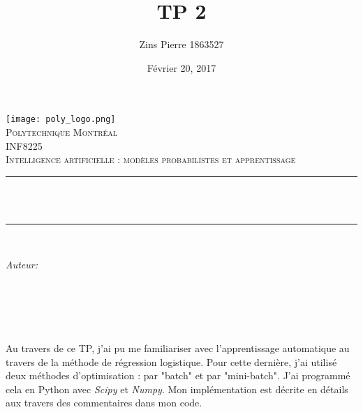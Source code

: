 \documentclass[12pt]{article}
\title{TP 2}								%
\author{Zins Pierre 1863527}						%
\date{Février 20, 2017}							%
\makeatletter
\let\thetitle\@title
\let\theauthor\@author
\let\thedate\@date
\makeatother
\begin{document}

\begin{titlepage}
	\centering
    \vspace*{0.5 cm}
    \texttt{[image: poly\_logo.png]}\\[1.0 cm]	%
    \textsc{\LARGE Polytechnique Montréal}\\[2.0 cm]	%
	\textsc{\Large INF8225 }\\[0.5 cm]				%
	\textsc{Intelligence artificielle : modèles probabilistes et apprentissage}\\[0.5 cm]				%
	\rule{\linewidth}{0.2 mm} \\[0.4 cm]
	{ \huge \bfseries \thetitle}\\
	\rule{\linewidth}{0.2 mm} \\[1.5 cm]
	
	\begin{minipage}{0.4\textwidth}
		\begin{flushleft} \large
			\emph{Auteur:}\\
			\theauthor
			\end{flushleft}
			\end{minipage}~
			\begin{minipage}{0.4\textwidth}
			\begin{flushright} \large
		\end{flushright}
	\end{minipage}\\[2 cm]
	
	{\large \thedate}\\[2 cm]
 
	\vfill
	
\end{titlepage}



Au travers de ce TP, j'ai pu me familiariser avec l'apprentissage automatique au travers de la méthode de régression logistique. Pour cette dernière, j'ai utilisé deux méthodes d'optimisation : par "batch" et par "mini-batch". J'ai programmé cela en Python avec \textit{Scipy} et \textit{Numpy}.
Mon implémentation est décrite en détails aux travers des commentaires dans mon code.
\end{document}
